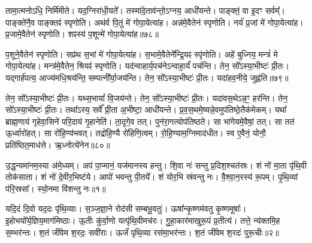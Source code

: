 तामा॒त्मनोऽधि॒ निर्मि॑मीते।
यद॒ग्निरा॑धी॒यते᳚।
तस्मा॑दे॒ताव॑न्तो॒\-ऽग्नय॒ आधी॑यन्ते।
पाङ्क्तं॒ वा इ॒दꣳ सर्वम्᳚।
पाङ्क्ते॑नै॒व पाङ्क्तꣴ॑ स्पृणोति।
अथ॑र्व पि॒तुं मे॑ गोपा॒येत्या॑ह।
अन्न॑मे॒वैतेन॑ स्पृणोति।
नर्य॑ प्र॒जां मे॑ गोपा॒येत्या॑ह।
प्र॒जामे॒वैतेन॑ स्पृणोति।
शꣴस्य॑ प॒शून्मे॑ गोपा॒येत्या॑ह॥७८॥

प॒शूने॒वैतेन॑ स्पृणोति।
सप्र॑थ स॒भां मे॑ गोपा॒येत्या॑ह।
स॒भामे॒वैतेने᳚न्द्रि॒यꣴ स्पृ॑णोति।
अहे॑ बुध्निय॒ मन्त्रं॑ मे गोपा॒येत्या॑ह।
मन्त्र॑मे॒वैतेन॒ श्रियꣴ॑ स्पृणोति।
यद॑न्वाहार्य॒पच॑ने\-ऽन्वाहा॒र्यं॑ पच॑न्ति।
तेन॒ सो᳚\-ऽस्या॒भीष्टः॑ प्री॒तः।
यद्गार्\mbox{}ह॑पत्य॒ आज्य॑मधि॒श्रय॑न्ति॒ सम्पत्नी᳚र्या॒जय॑न्ति।
तेन॒ सो᳚\-ऽस्या॒भीष्टः॑ प्री॒तः।
यदा॑हव॒नीये॒ जुह्व॑ति॥७९॥

तेन॒ सो᳚\-ऽस्या॒भीष्टः॑ प्री॒तः।
यथ्स॒भायां᳚ वि॒जय॑न्ते।
तेन॒ सो᳚\-ऽस्या॒भीष्टः॑ प्री॒तः।
यदा॑वस॒थे\-ऽन्न॒ꣳ॒ हर॑न्ति।
तेन॒ सो᳚\-ऽस्या॒भीष्टः॑ प्री॒तः।
तथा᳚ऽस्य॒ सर्वे᳚ प्री॒ता अ॒भीष्टा॒ आधी॑यन्ते।
प्र॒व॒स॒थमे॒ष्यन्ने॒वमुप॑तिष्ठे॒तैक॑मेकम्।
यथा᳚ ब्राह्म॒णाय॑ गृहेवा॒सिने॑ परि॒दाय॑ गृ॒हानेति॑।
ता॒दृगे॒व तत्।
पुन॑रा॒गत्योप॑तिष्ठते।
सा भा॑गेयमे॒वैषां॒ तत्।
सा तत॑ ऊ॒र्ध्वारो॑हत्।
सा रो॑हि॒ण्य॑भवत्।
तद्रो॑हि॒ण्यै रो॑हिणि॒त्वम्।
रो॒हि॒ण्याम॒ग्निमाद॑धीत।
स्व ए॒वैनं॒ योनौ॒ प्रति॑\-ष्ठित॒माध॑त्ते।
ऋ॒ध्नोत्ये॑नेन॥८०॥\anuvakamend[ए॒षा प॒शून्मे॑ गोपा॒येति॒ प्रवि॑ष्टा प॒शून्मे॑ गोपा॒येत्या॑ह॒ जुह्व॑ति तिष्ठते स॒प्त च॑]





\clearpage
{}
\setcounter{anuvakam}{0}

उ॒द्ध॒न्यमा॑नम॒स्या अ॑मे॒ध्यम्।
अप॑ पा॒प्मानं॒ यज॑मानस्य हन्तु।
शि॒वा नः॑ सन्तु प्र॒दिश॒श्चत॑स्रः।
शं नो॑ मा॒ता पृ॑थि॒वी तोक॑साता।
शं नो॑ दे॒वीर॒भिष्ट॑ये।
आपो॑ भवन्तु पी॒तये᳚।
शं योर॒भि स्र॑वन्तु नः।
वै॒श्वा॒न॒रस्य॑ रू॒पम्।
पृ॒थि॒व्यां प॑रि॒स्रसा᳚।
स्यो॒नमा वि॑शन्तु नः॥१॥

यदि॒दं दि॒वो यद॒दः पृ॑थि॒व्याः।
स॒ञ्ज॒ज्ञा॒ने रोद॑सी सम्बभू॒वतुः॑।
ऊषा᳚न्कृ॒ष्णम॑वतु कृ॒ष्णमूषाः᳚।
इ॒होभयो᳚र्य॒ज्ञिय॒\-माग॑मिष्ठाः।
ऊ॒तीः कु॑र्वा॒णो यत्पृ॑थि॒वीमच॑रः।
गु॒हा॒कार॑माखुरू॒पं प्र॒तीत्य॑।
तत्ते॒ न्य॑क्तमि॒ह स॒म्भर॑न्तः।
श॒तं जी॑वेम श॒रदः॒ सवी॑राः।
ऊर्जं॑ पृथि॒व्या रस॑मा॒भर॑न्तः।
श॒तं जी॑वेम श॒रदः॑ पुरू॒चीः॥२॥

